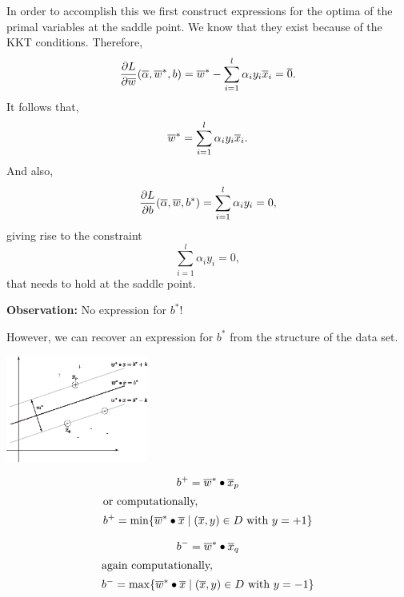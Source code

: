 \documentclass[a4paper,blends,pdf,colorBG,slideColor]{prosper}
\begin{document}
In order to accomplish this we first construct expressions for the optima of the primal variables 
at the saddle point.  We know that they exist because of the KKT conditions.  Therefore,
\begin{equation*}
\frac{\partial L}{\partial \overline{w}} (\overline{\alpha},\overline{w}^*,b)=
	\overline{w}^* - \sum_{i=1}^l \alpha_i y_i  \overline{x}_i = \overline{0}.
\end{equation*}
It follows that,
\begin{equation*}
\overline{w}^* = \sum_{i=1}^l \alpha_i y_i  \overline{x}_i.
\end{equation*}
And also,
\begin{equation*}
\frac{\partial L}{\partial b}  (\overline{\alpha},\overline{w},b^*)= \sum_{i=1}^l \alpha_i y_i  = 0,
\end{equation*}
giving rise to the constraint
\begin{equation*}
 \sum_{i=1}^l \alpha_i y_i  = 0,
\end{equation*}
that needs to hold at the saddle point.
\es

\small
{\bf Observation:} No expression for $b^*$!

However, we can recover an expression for $b^*$ from the structure of the data set.
\begin{center}
\includegraphics[height=35mm]{figures/fig06-05.eps}
\end{center}
\begin{minipage}{2.2in}
\scriptsize
\begin{gather*}
b^+ = \overline{w}^*\bullet\overline{x}_p\\
\intertext{or computationally,}
b^+ = \min \{\overline{w}^*\bullet\overline{x} \mid (\overline{x},y)\in D \text{ with } y = +1\}
\end{gather*}
\end{minipage}
\begin{minipage}{1.8in}
\small
\begin{gather*}
b^- = \overline{w}^*\bullet\overline{x}_q\\
\intertext{again computationally,}
b^- = \max\{\overline{w}^*\bullet\overline{x} \mid (\overline{x},y)\in D \text{ with } y = -1\}
\end{gather*}
\end{minipage}
\es
\end{document}
